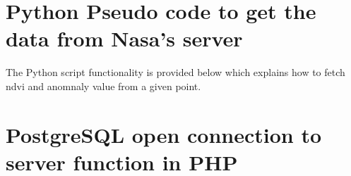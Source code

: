 \appendix
%
%

\chapter{Python Pseudo code to get the data from Nasa's server}\label{append:python_script_appendix}

The Python script functionality is provided below which explains how to fetch \gls{ndvi} and anomnaly value from a given point. 



\newpage

\chapter{PostgreSQL open connection to server function in PHP}\label{append:php_webservice}



\newpage


